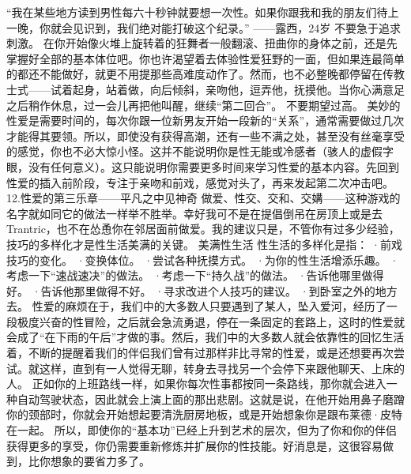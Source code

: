 \documentclass[12pt,UTF8]{ctexbook}
\begin{document}
“我在某些地方读到男性每六十秒钟就要想一次性。如果你跟我和我的朋友们待上一晚，你就会见识到，我们绝对能打破这个纪录。”
——露西，24岁
不要急于追求刺激。
在你开始像火堆上旋转着的狂舞者一般翻滚、扭曲你的身体之前，还是先掌握好全部的基本体位吧。你也许渴望着去体验性爱狂野的一面，但如果连最简单的都还不能做好，就更不用提那些高难度动作了。然而，也不必整晚都停留在传教士式——试着起身，站着做，向后倾斜，亲吻他，逗弄他，抚摸他。当你心满意足之后稍作休息，过一会儿再把他叫醒，继续“第二回合”。
不要期望过高。
美妙的性爱是需要时间的，每次你跟一位新男友开始一段新的“关系”，通常需要做过几次才能得其要领。所以，即使没有获得高潮，还有一些不满之处，甚至没有丝毫享受的感觉，你也不必大惊小怪。这并不能说明你是性无能或冷感者（骇人的虚假字眼，没有任何意义）。这只能说明你需要更多时间来学习性爱的基本内容。先回到性爱的插入前阶段，专注于亲吻和前戏，感觉对头了，再来发起第二次冲击吧。
12.性爱的第三乐章——平凡之中见神奇
做爱、性交、交和、交媾——这种游戏的名字就如同它的做法一样举不胜举。幸好我可不是在提倡倒吊在房顶上或是去Trantric，也不在怂恿你在邻居面前做爱。我的建议只是，不管你有过多少经验，技巧的多样化才是性生活美满的关键。
美满性生活
性生活的多样化是指：
·前戏技巧的变化。
·变换体位。
·尝试各种抚摸方式。
·为你的性生活增添乐趣。
·考虑一下“速战速决”的做法。
·考虑一下“持久战”的做法。
·告诉他哪里做得好。
·告诉他那里做得不好。
·寻求改进个人技巧的建议。
·到卧室之外的地方去。
性爱的麻烦在于，我们中的大多数人只要遇到了某人，坠入爱河，经历了一段极度兴奋的性冒险，之后就会急流勇退，停在一条固定的套路上，这时的性爱就会成了“在下雨的午后”才做的事。然后，我们中的大多数人就会依靠性的回忆生活着，不断的提醒着我们的伴侣我们曾有过那样非比寻常的性爱，或是还想要再次尝试。就这样，直到有一人觉得无聊，转身去寻找另一个会停下来跟他聊天、上床的人。
正如你的上班路线一样，如果你每次性事都按同一条路线，那你就会进入一种自动驾驶状态，因此就会上演上面的那出悲剧。这就是说，在他开始用鼻子磨蹭你的颈部时，你就会开始想起要清洗厨房地板，或是开始想象你是跟布莱德·皮特在一起。
所以，即使你的“基本功”已经上升到艺术的层次，但为了你和你的伴侣获得更多的享受，你仍需要重新修炼并扩展你的性技能。好消息是，这很容易做到，比你想象的要省力多了。
\end{document}
